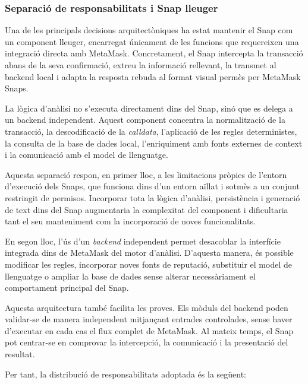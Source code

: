 \subsubsection{Separació de responsabilitats i Snap lleuger}
\label{sec:snap_lleuger}

Una de les principals decisions arquitectòniques ha estat mantenir el Snap com un component lleuger, encarregat únicament de les funcions que requereixen una integració directa amb MetaMask. Concretament, el Snap intercepta la transacció abans de la seva confirmació, extreu la informació rellevant, la transmet al backend local i adapta la resposta rebuda al format visual permès per MetaMask Snaps.

La lògica d’anàlisi no s’executa directament dins del Snap, sinó que es delega a un backend independent. Aquest component concentra la normalització de la transacció, la descodificació de la \textit{calldata}, l’aplicació de les regles deterministes, la consulta de la base de dades local, l’enriquiment amb fonts externes de context i la comunicació amb el model de llenguatge.

Aquesta separació respon, en primer lloc, a les limitacions pròpies de l’entorn d’execució dels Snaps, que funciona dins d’un entorn aïllat i sotmès a un conjunt restringit de permisos. Incorporar tota la lògica d’anàlisi, persistència i generació de text dins del Snap augmentaria la complexitat del component i dificultaria tant el seu manteniment com la incorporació de noves funcionalitats.

En segon lloc, l’ús d’un \textit{backend} independent permet desacoblar la interfície integrada dins de MetaMask del motor d’anàlisi. D’aquesta manera, és possible modificar les regles, incorporar noves fonts de reputació, substituir el model de llenguatge o ampliar la base de dades sense alterar necessàriament el comportament principal del Snap.

Aquesta arquitectura també facilita les proves. Els mòduls del backend poden validar-se de manera independent mitjançant entrades controlades, sense haver d’executar en cada cas el flux complet de MetaMask. Al mateix temps, el Snap pot centrar-se en comprovar la intercepció, la comunicació i la presentació del resultat.

Per tant, la distribució de responsabilitats adoptada és la següent:

